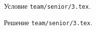 \problem{}
Условие \texttt{team/senior/3.tex}.

\solution Решение \texttt{team/senior/3.tex}.
\endproblem
